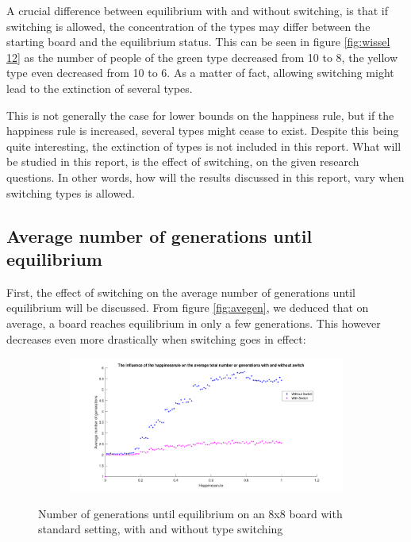 A crucial difference between equilibrium with and without switching, is that if switching is allowed, the concentration of the types may differ between the starting board and the equilibrium status. 
This can be seen in figure \ref{fig:wissel 12} as the number of people of the green type decreased from 10 to 8, the yellow type even decreased from 10 to 6. 
As a matter of fact, allowing switching might lead to the extinction of several types. 

This is not generally the case for lower bounds on the happiness rule, but if the happiness rule is increased, several types might cease to exist. Despite this being quite interesting, the extinction of types is not included in this report.
What will be studied in this report, is the effect of switching, on the given research questions. In other words, how will the results discussed in this report, vary when switching types is allowed. 
\newpage

\subsection{Average number of generations until equilibrium}\label{subsec:avegensw}
First, the effect of switching on the average number of generations until equilibrium will be discussed. 
From figure \ref{fig:avegen}, we deduced that on average, a board reaches equilibrium in only a few generations. This however decreases even more drastically when switching goes in effect:

\begin{figure}[H]
	\centering
    \begin{subfigure}{0.9\textwidth}
        \includegraphics[width=\textwidth]{happinessrule-totaantgenwithswitchorwithoutswitch}
    \end{subfigure}
    \caption{Number of generations until equilibrium on an 8x8 board with standard setting, with and without type switching}
    \label{fig:AantGenS}
\end{figure}

